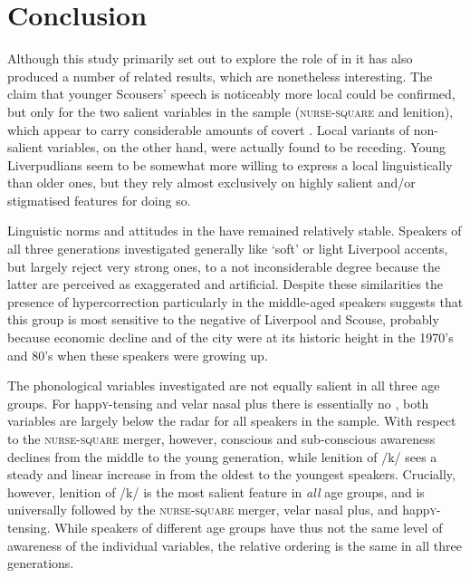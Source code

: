 \chapter{Conclusion}
\label{ch.conclusion}

Although this study primarily set out to explore the role of  in   it has also produced a number of related results, which are nonetheless interesting.
The claim that younger Scousers' speech is noticeably more local \parencite[cf.][]{watson2007a} could be confirmed, but only for the two salient variables in the sample (\textsc{nurse}-\textsc{square} and lenition), which appear to carry considerable amounts of covert .
Local variants of non-salient variables, on the other hand, were actually found to be receding.
Young Liverpudlians seem to be somewhat more willing to express a local  linguistically than older ones, but they rely almost exclusively on highly salient and/or stigmatised features for doing so.

Linguistic norms and attitudes in the  have remained relatively stable.
Speakers of all three generations investigated generally like `soft' or light Liverpool accents, but largely reject very strong ones, to a not inconsiderable degree because the latter are perceived as exaggerated and artificial.
Despite these similarities the presence of hypercorrection particularly in the middle-aged speakers suggests that this group is most sensitive to the negative  of Liverpool and Scouse, probably because economic decline and  of the city were at its historic height in the 1970's and 80's when these speakers were growing up.

The phonological variables investigated are not equally salient in all three age groups.
For happ\textsc{y}-tensing and velar nasal plus there is essentially no , both variables are largely below the radar for all speakers in the sample.
With respect to the \textsc{nurse}-\textsc{square} merger, however, conscious and sub-conscious awareness declines from the middle to the young generation, while lenition of /k/ sees a steady and linear increase in  from the oldest to the youngest speakers.
Crucially, however, lenition of /k/ is the most salient feature in \emph{all} age groups, and is universally followed by the \textsc{nurse}-\textsc{square} merger, velar nasal plus, and happ\textsc{y}-tensing.
While speakers of different age groups have thus not the same level of awareness of the individual variables, the relative ordering is the same in all three generations.

